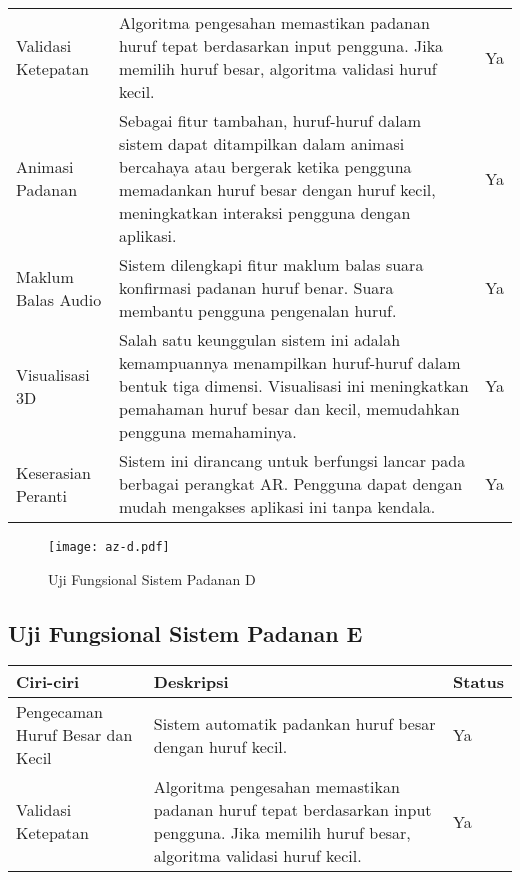\begin{itemize}
\begin{itemize}
\begin{itemize}
\begin{itemize}
\begin{itemize}
\begin{itemize}
\begin{itemize}
\begin{itemize}
\begin{flushleft}
\begin{tabular}{>{\raggedright}p{3cm}p{9cm}>{\centering\arraybackslash}p{2cm}}
Validasi Ketepatan & Algoritma pengesahan memastikan padanan huruf tepat berdasarkan input pengguna. Jika memilih huruf besar, algoritma validasi huruf kecil. & Ya \\

Animasi Padanan & Sebagai fitur tambahan, huruf-huruf dalam sistem dapat ditampilkan dalam animasi bercahaya atau bergerak ketika pengguna memadankan huruf besar dengan huruf kecil, meningkatkan interaksi pengguna dengan aplikasi. & Ya \\

Maklum Balas Audio & Sistem dilengkapi fitur maklum balas suara konfirmasi padanan huruf benar. Suara membantu pengguna pengenalan huruf. & Ya \\

Visualisasi 3D & Salah satu keunggulan sistem ini adalah kemampuannya menampilkan huruf-huruf dalam bentuk tiga dimensi. Visualisasi ini meningkatkan pemahaman huruf besar dan kecil, memudahkan pengguna memahaminya. & Ya \\

Keserasian Peranti & Sistem ini dirancang untuk berfungsi lancar pada berbagai perangkat AR. Pengguna dapat dengan mudah mengakses aplikasi ini tanpa kendala. & Ya \\
\bottomrule
\end{tabular}

\begin{figure}[h]
    \centering
    \texttt{[image: az-d.pdf]}
    \caption{ Uji Fungsional  Sistem Padanan D }
    \label{az-d.pdf}
\end{figure}
\clearpage


\subsection{ Uji Fungsional  Sistem Padanan E }

\begin{tabular}{>{\raggedright}p{3cm}p{9cm}>{\centering\arraybackslash}p{2cm}}
\toprule
\textbf{Ciri-ciri} & \textbf{Deskripsi} & \textbf{Status} \\
\midrule
Pengecaman Huruf Besar dan Kecil & Sistem automatik padankan huruf besar dengan huruf kecil. & Ya \\

Validasi Ketepatan & Algoritma pengesahan memastikan padanan huruf tepat berdasarkan input pengguna. Jika memilih huruf besar, algoritma validasi huruf kecil. & Ya \\


\end{tabular}
\end{flushleft}
\end{itemize}
\end{itemize}
\end{itemize}
\end{itemize}
\end{itemize}
\end{itemize}
\end{itemize}
\end{itemize}
